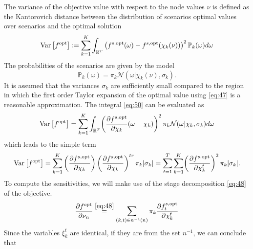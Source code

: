The variance of the objective value with respect to the node values $\nu$ is defined as the Kantorovich distance between the distribution of scenarios optimal values over scenarios and the optimal solution
\begin{equation}
  \label{eq:50}
  \mathrm{Var}\left[f^{\mathrm{opt}}\right] :=  \sum_{k=1}^K\int_{\mathbb{R}^T} \left(f^{s,\mathrm{opt}}(\omega)-f^{s,\mathrm{opt}}\mathopen{}\left(\chi_k(\nu)\right)\right)^2\mathbb{P}_k(\omega)d\omega
\end{equation}
The probabilities of the scenarios are given by the model
\begin{equation}
  \label{eq:55}
  \mathbb{P}_k(\omega) = \pi_k\mathcal{N}(\omega|\chi_{k}(\nu),\sigma_k).
\end{equation}
It is assumed that the variances $\sigma_k$ are sufficiently small compared to the region in which the first order Taylor expansion of the optimal value using \eqref{eq:47} is a reasonable approximation.
The integral \eqref{eq:50} can be evaluated as
\begin{equation}
  \label{eq:52}
  \operatorname{Var}\left[f^{\mathrm{opt}}\right] = \sum_{k=1}^K\int_{\mathbb{R}^T} \mathopen{}\left(\frac{\partial f^{s,\mathrm{opt}}}{\partial \chi_k}(\omega-\chi_k)\right)^2\pi_k\mathcal{N}(\omega|\chi_k,\sigma_k)d\omega
\end{equation}
which leads to the simple term
\begin{equation}
  \label{eq:54}
  \operatorname{Var}\left[f^{\mathrm{opt}}\right] = \sum_{k=1}^K \left(\frac{\partial f^{s,\mathrm{opt}}}{\partial\chi_k} \right)\left(\frac{\partial f^{s,\mathrm{opt}}}{\partial\chi_k} \right)^{tr}\pi_k|\sigma_k| = \sum_{t=1}^T\sum_{k=1}^K\mathopen{}\left(\frac{\partial f^{s,\mathrm{opt}}}{\partial \chi_{k}^t}\right)^2 \pi_k|\sigma_k|.
\end{equation}
To compute the sensitivities, we will make use of the stage decomposition \eqref{eq:48} of the objective.
\begin{equation}
  \label{eq:51}
  \frac{\partial f^{\mathrm{opt}}}{\partial \nu_n} \overset{\eqref{eq:48}}{=} \sum_{(k,t)\in n^{-1}(n)}\pi_k\frac{\partial f_{t}^{s,\mathrm{opt}}}{\partial \chi_{k}^t}
\end{equation}
Since the variables $\xi_{k}^t$ are identical, if they are from the set $n^{-1}$, we can conclude that
